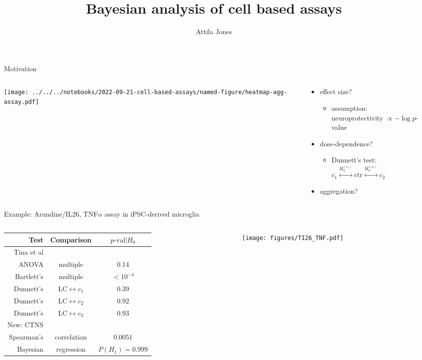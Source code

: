 \documentclass[aspectratio=169]{beamer}
\title{Bayesian analysis of cell based assays}
\subtitle{}
\author{Attila Jones}
\date{}
\begin{document}
\titlepage

\begin{frame}{Motivation}
\begin{columns}[t]
\begin{column}{0.5\textwidth}

\texttt{[image: ../../../notebooks/2022-09-21-cell-based-assays/named-figure/heatmap-agg-assay.pdf]}
\end{column}

\begin{column}{0.5\textwidth}
  \begin{itemize}
    \item effect size?
  \begin{itemize}
    \item assumption:\\neuroprotectivity $\propto -\log p$-value
  \end{itemize}
    \item dose-dependence?
  \begin{itemize}
    \item Dunnett's test: $c_1 \overset{H_0^{(c_1)}}{\leftrightarrow} \mathrm{ctr} \overset{H_0^{(c_2)}}{\leftrightarrow} c_2$
  \end{itemize}
    \item aggregation?
  \end{itemize}
\end{column}
\end{columns}
\end{frame}

\begin{frame}{Example: Arundine/IL26, TNF$\alpha$ assay in iPSC-derived microglia }
\begin{columns}[t]
\begin{column}{0.4\textwidth}

\begin{tabular}{rcc}
  Test & Comparison & $p\text{-val}|H_0$  \\
  \hline
  Tina et al & & \\
  \hline
  ANOVA & multiple & 0.14 \\
  Bartlett's & multiple & $<10^{-4}$ \\
  Dunnett's & $\mathrm{LC} \leftrightarrow c_1$ & 0.39 \\
  Dunnett's & $\mathrm{LC} \leftrightarrow c_2$ & 0.92 \\
  Dunnett's & $\mathrm{LC} \leftrightarrow c_3$ & 0.93 \\
  \hline
  \alert{New: CTNS} & & \\
  \hline
  Spearman's & correlation & $0.0051$ \\
  Bayesian  & regression & $P(H_1) = 0.999$ \\
  \hline
  \end{tabular}
\end{column}

\begin{column}{0.6\textwidth}

\texttt{[image: figures/TI26\_TNF.pdf]}
\end{column}
\end{columns}
\end{frame}
\end{document}
